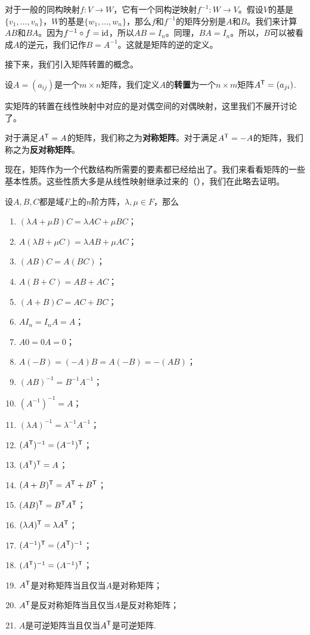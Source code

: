 对于一般的同构映射$f:V\to W$，它有一个同构逆映射$f^{-1}:W\to V$。假设$V$的基是$\{v_1,\dots,v_n\}$，$W$的基是$\{w_1,\dots,w_n\}$，那么$f$和$f^{-1}$的矩阵分别是$A$和$B$。我们来计算$AB$和$BA$。因为$f^{-1}\circ f=\mathrm{id}$，所以$AB=I_n$。同理，$BA=I_n$。所以，$B$可以被看成$A$的逆元，我们记作$B=A^{-1}$。这就是矩阵的逆的定义。

接下来，我们引入矩阵转置的概念。

\begin{definition}[矩阵转置]
    设$A=(a_{ij})$是一个$m\times n$矩阵，我们定义$A$的\textbf{转置}为一个$n\times m$矩阵$A^{\mathsf{T}}=(a_{ji})$.
\end{definition}
实矩阵的转置在线性映射中对应的是对偶空间的对偶映射，这里我们不展开讨论了。

对于满足$A^{\mathsf{T}}=A$的矩阵，我们称之为\textbf{对称矩阵}。对于满足$A^{\mathsf{T}}=-A$的矩阵，我们称之为\textbf{反对称矩阵}。

现在，矩阵作为一个代数结构所需要的要素都已经给出了。我们来看看矩阵的一些基本性质。这些性质大多是从线性映射继承过来的（），我们在此略去证明。

\begin{proposition}\label{prop:mat-basic}
    设$A,B,C$都是域$F$上的$n$阶方阵，$\lambda,\mu\in F$，那么
    \begin{enumerate}
        \item $(\lambda A+\mu B)C=\lambda AC+\mu BC$；
        \item $A(\lambda B+\mu C)=\lambda AB+\mu AC$；
        \item $(AB)C=A(BC)$；
        \item $A(B+C)=AB+AC$；
        \item $(A+B)C=AC+BC$；
        \item $AI_n=I_nA=A$；
        \item $A0=0A=0$；
        \item $A(-B)=(-A)B=A(-B)=-(AB)$；
        \item $(AB)^{-1}=B^{-1}A^{-1}$；
        \item $(A^{-1})^{-1}=A$；
        \item $(\lambda A)^{-1}=\lambda^{-1}A^{-1}$；
        \item $(A^{\mathsf{T}} )^{-1}=(A^{-1})^{\mathsf{T}} $；
        \item $(A^{\mathsf{T}} )^{\mathsf{T}} =A$；
        \item $(A+B)^{\mathsf{T}} =A^{\mathsf{T}} +B^{\mathsf{T}} $；
        \item $(AB)^{\mathsf{T}} =B^{\mathsf{T}} A^{\mathsf{T}} $；
        \item $(\lambda A)^{\mathsf{T}} =\lambda A^{\mathsf{T}} $；
        \item $(A^{-1})^{\mathsf{T}} =(A^{\mathsf{T}} )^{-1}$；
        \item $(A^{\mathsf{T}} )^{-1}=(A^{-1})^{\mathsf{T}} $；
        \item $A^{\mathsf{T}} $是对称矩阵当且仅当$A$是对称矩阵；
        \item $A^{\mathsf{T}} $是反对称矩阵当且仅当$A$是反对称矩阵；
        \item $A$是可逆矩阵当且仅当$A^{\mathsf{T}} $是可逆矩阵.
    \end{enumerate}
\end{proposition}

